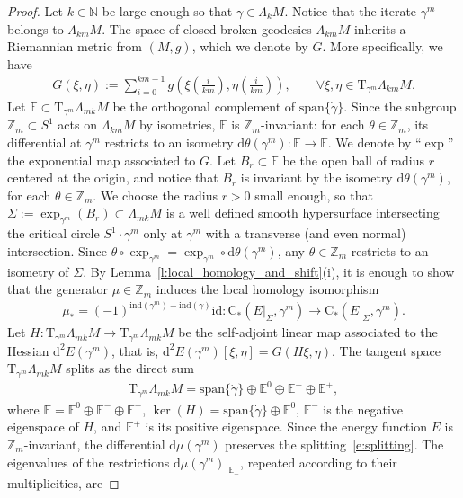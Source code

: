 \documentclass[reqno]{amsart}
\numberwithin{equation}{section}
\theoremstyle{personal}%
\theoremstyle{definition}
\newcommand{\N}{\mathds{N}}
\newcommand{\E}{\mathds{E}}
\newcommand{\Z}{\mathds{Z}}
\newcommand{\diff}{\mathrm{d}}
\newcommand{\Tan}{\mathrm{T}}
\newcommand{\Loc}{\mathrm{C}}
\newcommand{\ind}{\mathrm{ind}}
\begin{document}
\begin{proof}
Let $k\in\N$ be large enough so that $\gamma\in\Lambda_kM$. Notice that the iterate $\gamma^m$  belongs to $\Lambda_{km}M$. The space of closed broken geodesics $\Lambda_{km}M$ inherits a Riemannian metric from $(M,g)$, which we denote by $G$. More specifically, we have
\begin{align*}
G(\xi,\eta):=\sum_{i=0}^{km-1} g(\xi(\tfrac{i}{km}),\eta(\tfrac{i}{km})),
\qquad
\forall \xi,\eta\in\Tan_{\gamma^m}\Lambda_{km}M.
\end{align*}
Let $\E\subset\Tan_{\gamma^m}\Lambda_{mk}M$ be the orthogonal complement of $\mathrm{span}\{\dot\gamma\}$. Since the subgroup $\Z_m\subset S^1$ acts on $\Lambda_{km}M$ by isometries, $\E$ is $\Z_m$-invariant: for each $\theta\in\Z_m$, its differential at $\gamma^m$ restricts to an isometry $\diff\theta(\gamma^m):\E\to \E$. We denote by ``$\exp$'' the exponential map associated to $G$. Let $B_r\subset \E$ be the open ball of radius $r$ centered at the origin, and notice that $B_r$ is invariant by the isometry $\diff\theta(\gamma^m)$, for each $\theta\in\Z_m$. We choose the radius $r>0$ small enough, so that $\Sigma:=\exp_{\gamma^m}(B_r)\subset\Lambda_{mk}M$ is a well defined smooth hypersurface intersecting the critical circle $S^1\cdot\gamma^m$ only at $\gamma^m$ with a transverse (and even normal) intersection. Since $\theta\circ\exp_{\gamma^m}=\exp_{\gamma^m}\circ\diff\theta(\gamma^m)$, any $\theta\in\Z_m$ restricts to an isometry of $\Sigma$. By Lemma~\ref{l:local_homology_and_shift}(i), it is enough to show that the generator $\mu\in\Z_m$ induces the local homology isomorphism
\begin{align*}
 \mu_*=(-1)^{\ind(\gamma^m)-\ind(\gamma)}\mathrm{id}:\Loc_*(E|_{\Sigma},\gamma^m)\to\Loc_*(E|_{\Sigma},\gamma^m).
\end{align*}
Let $H:\Tan_{\gamma^m}\Lambda_{mk}M\to\Tan_{\gamma^m}\Lambda_{mk}M$ be the self-adjoint linear map associated to the Hessian $\diff^2E(\gamma^m)$, that is, $\diff^2E(\gamma^m)[\xi,\eta]=G(H\xi,\eta)$. The tangent space $\Tan_{\gamma^m}\Lambda_{mk}M$ splits as the direct sum
\begin{align}
\label{e:splitting}
 \Tan_{\gamma^m}\Lambda_{mk}M
 =
 \mathrm{span}\{\dot\gamma\}\oplus\E^0\oplus\E^-\oplus\E^+,
\end{align}
where $\E=\E^0\oplus\E^-\oplus\E^+$, $\ker(H)=\mathrm{span}\{\dot\gamma\}\oplus\E^0$, $\E^-$ is the negative eigenspace of $H$, and $\E^+$ is its positive eigenspace. Since the energy function $E$ is $\Z_m$-invariant, the differential $\diff\mu(\gamma^m)$ preserves the splitting~\eqref{e:splitting}. The eigenvalues of the restrictions $\diff\mu(\gamma^m)|_{\E_-}$, repeated according to their multiplicities, are

\end{proof}
\end{document}
